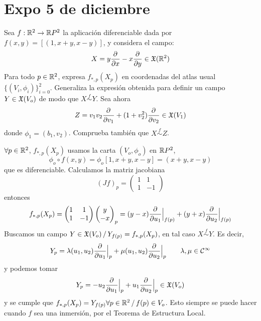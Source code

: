 \section{Expo 5 de diciembre}
\begin{ejer}
    [1] Sea $f : \mathbb{R}^2 \to \mathbb{R} P^2$ la aplicaci\'on diferenciable dada por $f(x, y) = [(1, x + y, x - y)]$, y considera el campo:
    $$X=y\dfrac{\partial^{} }{\partial x}-x\dfrac{\partial^{} }{\partial y} \in \mathfrak X(\mathbb{R}^2)$$
   Para todo $p \in \mathbb{R}^2$, expresa $f_{*,p}(X_p)$ en coordenadas del atlas usual $\{(V_i, \phi_i)\}_{i=0}^2$. Generaliza la expresi\'on obtenida para definir un campo $Y \in \mathfrak{X}(V_o)$ de modo que $X\overset{f}{\sim} Y$. Sea ahora 
   $$Z=v_1v_2 \dfrac{\partial^{} }{\partial v_1} + (1+v_2^2)\dfrac{\partial^{} }{\partial v_2} \in \mathfrak{X}(V_1)$$
   donde $\phi_1= (b_1,v_2)$. Comprueba tambi\'en que $X \overset{f}{\sim} Z$. 
\end{ejer}
\begin{sol}
    $\forall p \in \mathbb{R}^2$, $f_{*,p}(X_p)$ usamos la carta $(V_o,\phi_o)$ en $\mathbb{R} P^2$, 
    $$\phi_o \circ f(x,y) = \phi_o [1,x+y,x-y] = (x+y,x-y)$$
    que es diferenciable. Calculamos la matriz jacobiana $$(Jf)_p = \begin{pmatrix}
        1 & 1 \\ 1 & -1
    \end{pmatrix}$$
    entonces
    $$f_{*,p}(X_p)= \begin{pmatrix}
        1 & 1 \\ 1 & -1
    \end{pmatrix}\begin{pmatrix}
        y \\ -x 
    \end{pmatrix}_p = (y-x) \dfrac{\partial^{} }{\partial u_1}\Big|_{f(p)} + (y+x) \dfrac{\partial^{} }{\partial u_2}\Big|_{f(p)}$$
    Buscamos un campo  $Y \in \mathfrak{X}(V_o) \, / \, Y_{f(p)}=f_{*,p}(X_p)$, en tal caso $X \overset{f}{\sim} Y$. Es decir, 
    $$Y_p = \lambda(u_1,u_2) \dfrac{\partial^{} }{\partial u_1}\Big|_p + \mu(u_1,u_2) \dfrac{\partial^{} }{\partial u_2} \Big|_p \qquad \lambda, \mu \in \mathcal{C}^{\infty}$$
    y podemos tomar
    $$Y_p = -u_2 \dfrac{\partial^{} }{\partial u_1}\Big|_p + u_1 \dfrac{\partial^{} }{\partial u_2}\Big|_p \in \mathfrak{X}(V_o)$$
    y se cumple que $f_{*,p}(X_p)=Y_{f(p)} \forall p \in \mathbb{R}^2 \, / \, f(p) \in V_o$. Esto siempre se puede hacer cuando $f$ sea una inmersi\'on, por el Teorema de Estructura Local.
\end{sol}
